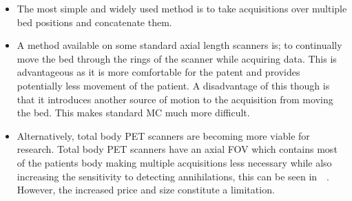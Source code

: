                 \begin{itemize}
                    \item The most simple and widely used method is to take acquisitions over multiple bed positions and concatenate them.
                    
                    \item A method available on some  standard axial length scanners is; to continually move the bed through the rings of the scanner while acquiring data. This is advantageous as it is more comfortable for the patent and provides potentially less movement of the patient. %
                    A disadvantage of this though is that it introduces another source of motion to the acquisition from moving the bed. This makes standard \gls{MC} much more difficult.
                    
                    \item Alternatively, total body \gls{PET} scanners are becoming more viable for research. %
                    Total body \gls{PET} scanners have an axial \gls{FOV} which contains most of the patients body making multiple acquisitions less necessary while also increasing the sensitivity to detecting annihilations, this can be seen in~~. However, the increased price and size constitute a limitation.
                \end{itemize}
            
